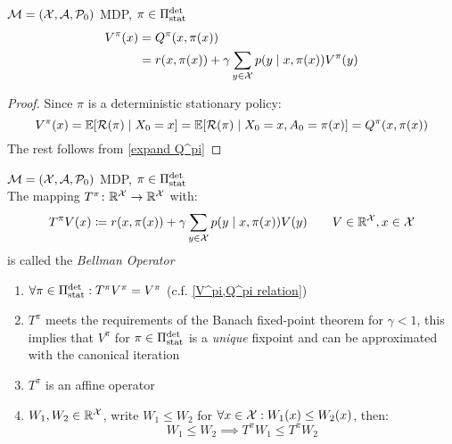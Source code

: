 \begin{corollary}\label{V^pi,Q^pi relation}  \(\mathcal{M}=(\mathcal{X},\mathcal{A},\mathcal{P}_0)\) MDP, \(\pi\in\Pi_{\textnormal{stat}}^{\textnormal{det}}\) 
\begin{align*}
	V^\pi(x)&=Q^\pi(x,\pi(x))\\
	 &=r(x,\pi(x))+\gamma\sum\limits_{y\in\mathcal{X}}p(y\mid x,\pi(x))V^\pi(y) 
\end{align*}
\end{corollary}

\begin{proof}
Since \(\pi\) is a deterministic stationary policy:
\[V^\pi(x)=\mathbb{E}[\mathcal{R}(\pi)\mid X_0=x]=\mathbb{E}[\mathcal{R}(\pi)\mid X_0=x, A_0=\pi(x)]=Q^\pi(x,\pi(x))\]
The rest follows from \ref{expand Q^pi}
\end{proof}

\begin{definition}\(\mathcal{M}=(\mathcal{X},\mathcal{A},\mathcal{P}_0)\) MDP, \(\pi\in\Pi_{\textnormal{stat}}^{\textnormal{det}}\) \\
The mapping \(T^\pi\colon\mathbb{R}^{\mathcal{X}}\to\mathbb{R}^{\mathcal{X}}\) with:
	\[
	T^\pi V(x)\coloneqq r(x,\pi(x))+\gamma\sum_{y\in\mathcal{X}}p(y\mid x,\pi(x)) V(y)\qquad V\in\mathbb{R}^{\mathcal{X}}, x\in\mathcal{X}
	\]
is called the \emph{Bellman Operator}
\end{definition}


\begin{remark}\leavevmode
	\begin{enumerate}[label=\arabic*.]
	\item \(\forall\pi\in\Pi_{\textnormal{stat}}^{\textnormal{det}} : T^\pi V^\pi=V^\pi\) (c.f. \ref{V^pi,Q^pi relation})
	\item\label{num:2} \(T^\pi\) meets the requirements of the Banach fixed-point theorem for \({\gamma<1}\), this implies that \(V^\pi\) for \(\pi\in\Pi_{\textnormal{stat}}^{\textnormal{det}}\)
	is a \emph{unique} fixpoint and can be approximated with the canonical iteration
	\item \(T^\pi\) is an affine operator
	\item\label{num:4} \(W_1,W_2\in\mathbb{R}^{\mathcal{X}}\), write \(W_1 \le W_2\) for \(\forall x\in\mathcal{X}:W_1(x)\le W_2(x)\), then:
	\[W_1\le W_2 \implies T^\pi W_1\le T^\pi W_2\]
	\end{enumerate}
\end{remark}

